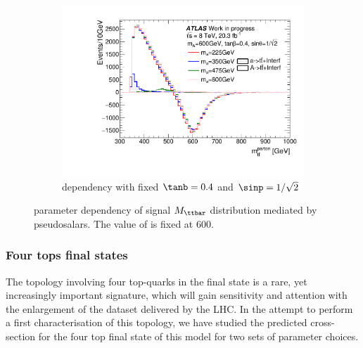 \begin{figure}
\begin{subfigure}[b]{0.49\textwidth}
\includegraphics[width=\textwidth]{texinputs/04_grid/figures/ttres/ttres_2HDMa_A_ma.pdf}
\caption{\ma dependency with fixed $\tanb=0.4$ and $\sinp=1/\sqrt{2}$}
\end{subfigure}
\caption{parameter dependency of signal $M_{\ttbar}$ distribution mediated by pseudosalars. The value of \mA is fixed at 600\GeV.}
\label{fig:ttres_2HDM_A}
\end{figure}
\FloatBarrier

\subsubsection{Four tops final states}

The topology involving four top-quarks in the final state is a rare,
yet increasingly important signature, which will gain sensitivity and
attention with the enlargement of the dataset delivered by the LHC.  
In the attempt to perform a first characterisation of this topology,
we have studied the predicted cross-section for the four top final
state of this model for two sets of parameter choices. 

